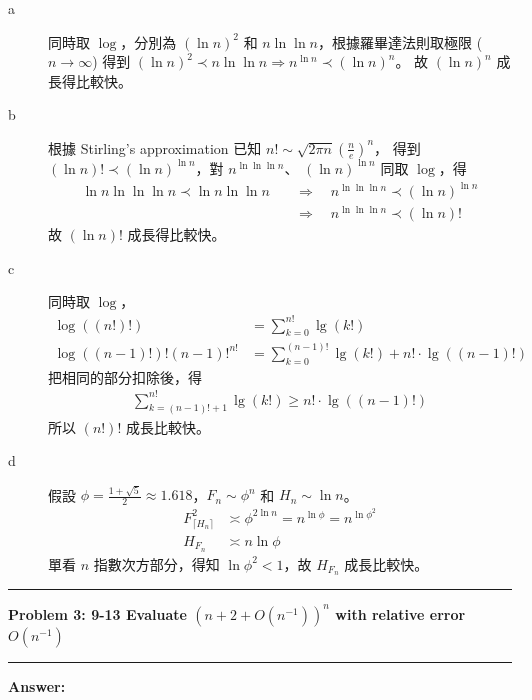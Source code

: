 \documentclass[11pt,fleqn]{article}
\newcommand\question[2]{\vspace{.25in}\hrule\textbf{#1: #2}\vspace{.5em}\hrule\vspace{.10in}}
\renewcommand\part[1]{\vspace{.10in}\textbf{#1}}
\begin{document}
\begin{description}
	\item[a] 同時取 $\log$，分別為 $(\ln n)^2$ 和 $n \ln \ln n$，根據羅畢達法則取極限 
		($n \rightarrow \infty$) 得到 
		$(\ln n)^2 \prec n \ln \ln n \Rightarrow n^{\ln n} \prec (\ln n)^n$。
		故 $(\ln n)^n$ 成長得比較快。
	\item[b] 根據 Stirling's approximation 已知 
		$n! \sim \sqrt{2 \pi n} \left(\frac{n}{e}\right)^n$，
		得到 $(\ln n)! \prec (\ln n)^{\ln n}$，對 $n^{\ln \ln \ln n}$、
		$(\ln n)^{\ln n}$ 同取 $\log$，得 
		\begin{align*}
			\ln n \ln \ln \ln n \prec \ln n \ln \ln n
				\quad &\Rightarrow \quad
			n^{\ln \ln \ln n} \prec (\ln n)^{\ln n} \\
			&\Rightarrow \quad
			n^{\ln \ln \ln n} \prec (\ln n)!
		\end{align*}
		故 $(\ln n)!$ 成長得比較快。
	\item[c] 同時取 $\log$，
		\begin{align*}
			\log ((n!)!) 
				&= \sum\nolimits_{k=0}^{n!} \lg (k!) \\
			\log ((n-1)!)! (n-1)!^{n!} 
				&= \sum\nolimits_{k=0}^{(n-1)!} \lg (k!) + n! \cdot \lg ((n-1)!)
		\end{align*}
		把相同的部分扣除後，得
		\begin{align*}
			\sum\nolimits_{k=(n-1)!+1}^{n!} \lg (k!) \ge n! \cdot \lg ((n-1)!)
		\end{align*}
		所以 $(n!)!$ 成長比較快。
	\item[d] 假設 $\phi = \frac{1 + \sqrt{5}}{2} \approx 1.618$，$F_n \sim \phi^n$ 
		和 $H_n \sim \ln n$。
		\begin{align*}
			F^2_{\lceil H_n \rceil} &
				\asymp \phi^{2 \ln n} = n^{\ln \phi} = n^{\ln \phi^2} \\
			H_{F_n} &
				\asymp n \ln \phi
		\end{align*}
		單看 $n$ 指數次方部分，得知 $\ln \phi^2 < 1$，故 $H_{F_n}$ 成長比較快。
\end{description}

\newpage

\question{Problem 3} {9-13 Evaluate $(n + 2 + O(n^{-1}))^n$ with relative 
	error $O(n^{-1})$
}

\part{Answer:}
\end{document}
